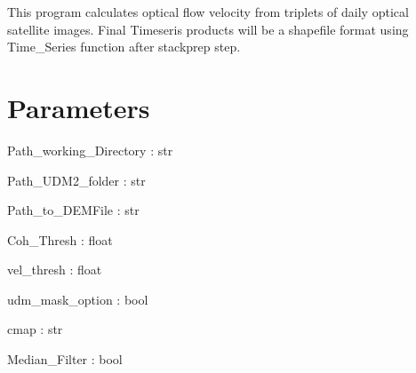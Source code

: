\documentclass[letterpaper,10pt]{sphinxmanual}
\begin{document}
\begin{fulllineitems}
\label{\detokenize{generated/akhdefo_functions.DynamicChangeDetection:akhdefo_functions.DynamicChangeDetection}}
\pysigstartsignatures
{}
\pysigstopsignatures
\sphinxAtStartPar
This program calculates optical flow velocity from triplets of daily optical satellite images.
Final Timeseris products will be a shapefile format using Time\_Series function after stackprep step.


\section{Parameters}
\label{\detokenize{generated/akhdefo_functions.DynamicChangeDetection:parameters}}
\sphinxAtStartPar
Path\_working\_Directory : str

\sphinxAtStartPar
Path\_UDM2\_folder : str

\sphinxAtStartPar
Path\_to\_DEMFile : str

\sphinxAtStartPar
Coh\_Thresh : float

\sphinxAtStartPar
vel\_thresh : float

\sphinxAtStartPar
udm\_mask\_option : bool

\sphinxAtStartPar
cmap : str

\sphinxAtStartPar
Median\_Filter : bool


\end{fulllineitems}
\end{document}
